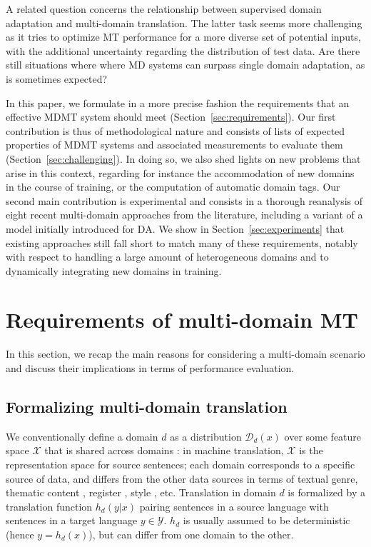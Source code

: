 \documentclass[11pt,a4paper]{article}
\newcommand{\fyDone}[1]{\done[FY]\Todo[FY:]{\textcolor{orange}{#1}}}
\newcommand{\revision}[1]{#1}
\begin{document}
A related question concerns the relationship between supervised domain adaptation and multi-domain translation. The latter task seems more challenging \revision{as it tries to optimize MT performance for a more diverse set of potential inputs, with the additional uncertainty regarding the distribution of test data.} Are there still situations where where MD systems can surpass single domain adaptation, as is sometimes expected?   

In this paper, we formulate in a more precise fashion the requirements that an effective MDMT system should meet (Section~\ref{sec:requirements}). Our first contribution is thus of methodological nature and consists of lists of expected properties of MDMT systems and associated measurements to evaluate them (Section~\ref{sec:challenging}). In doing so, we also shed lights on new problems that arise in this context, regarding for instance the accommodation of new domains in the course of training, or the computation of automatic domain tags.\fyDone{New problems - continuous learning, automatic domains} Our second main contribution is experimental and consists in a thorough reanalysis of eight recent multi-domain approaches from the literature, including a variant of a model initially introduced for DA. We show in Section~\ref{sec:experiments} that existing approaches still fall short to match many of these requirements, notably with respect to handling a large amount of heterogeneous domains and to dynamically integrating new domains in training.\fyDone{Spell out conclusions}
 
\section{Requirements of multi-domain MT \label{sec:requirements}}
In this section, we recap the main reasons for considering a multi-domain scenario and discuss their implications in terms of performance evaluation.
\fyDone{Relation to theory, discussion of worst case scenario}
\fyDone{Insist on the work of Dredze}

\subsection{Formalizing multi-domain translation \label{ssec:formalization}}

We conventionally define a domain $d$ as a distribution $\mathcal{D}_d(x)$ over some feature space $\mathcal{X}$ that is shared across domains \cite{Pan10asurvey}: in machine translation, $\mathcal{X}$ is the representation space for source sentences; each domain corresponds to a specific source of data, and differs from the other data sources in terms of textual genre, thematic content \cite{Chen16guided,Zhang16topicinformed}, register \cite{Sennrich16politeness}, style \cite{Niu18multitask}, etc. Translation in domain $d$ is formalized by a translation function $h_d(y|x)$ pairing sentences in a source language with sentences in a target language $y \in \mathcal{Y}$. $h_d$ is usually assumed to be deterministic (hence $y = h_d(x)$), but can differ from one domain to the other.
\end{document}
